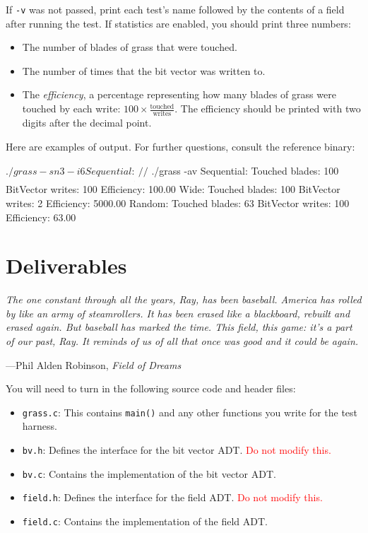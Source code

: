 \documentclass[11pt]{article}
\begin{document}
If \texttt{-v} was not passed, print each test's name followed by the contents of a field after running the test. If statistics are enabled, you should print three numbers:

\begin{itemize}
    \item The number of blades of grass that were touched.
    \item The number of times that the bit vector was written to.
    \item The \emph{efficiency}, a percentage representing how many blades of grass were touched by each write: $100 \times \frac{\text{touched}}{\text{writes}}$. The efficiency should be printed with two digits after the decimal point.
\end{itemize}

Here are examples of output. For further questions, consult the reference binary:

\begin{shlisting}{}
$ ./grass -sn 3 -i 6
Sequential:
___
___
///
$ ./grass -av
Sequential:
  Touched blades:         100
  BitVector writes:       100
  Efficiency:             100.00%
Wide:
  Touched blades:         100
  BitVector writes:         2
  Efficiency:            5000.00%
Random:
  Touched blades:          63
  BitVector writes:       100
  Efficiency:              63.00%
\end{shlisting}

\section{Deliverables}

\epigraph{\emph{The one constant through all the years, Ray, has been baseball. America has rolled by like an army of steamrollers. It has been erased like a blackboard, rebuilt and erased again. But baseball has marked the time. This field, this game: it's a part of our past, Ray. It reminds of us of all that once was good and it could be again.}}{---Phil Alden Robinson, \emph{Field of Dreams}}

\noindent
You will need to turn in the following source code and header files:

\begin{itemize}
    \item \texttt{grass.c}: This contains \texttt{main()} and any other functions you write for the test harness.
    \item \texttt{bv.h}: Defines the interface for the bit vector ADT. \textcolor{red}{Do not modify this.}
    \item \texttt{bv.c}: Contains the implementation of the bit vector ADT.
    \item \texttt{field.h}: Defines the interface for the field ADT. \textcolor{red}{Do not modify this.}
    \item \texttt{field.c}: Contains the implementation of the field ADT.
\end{itemize}
\end{document}
